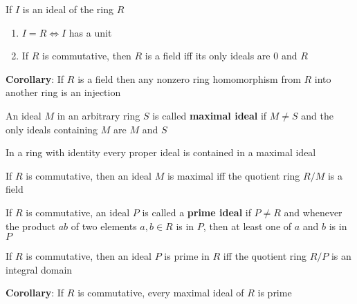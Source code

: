 \documentclass[titlepage, 12pt]{book}
\begin{document}
\begin{proposition}{}{}
    If $I$ is an ideal of the ring $R$
    \begin{enumerate}
        \item $I = R\iff I$ has a unit
        \item If $R$ is commutative, then $R$ is a field iff its only ideals are
            $0$ and $R$
    \end{enumerate}
\end{proposition}

\textbf{Corollary}: If $R$ is a field then any nonzero ring homomorphism from
$R$ into another ring is an injection

\begin{definition}{}{}
    An ideal $M$ in an arbitrary ring $S$ is called \textbf{maximal ideal} if
    $M\neq S$ and the only ideals containing $M$ are $M$ and $S$
\end{definition}

\begin{proposition}{}{}
    In a ring with identity every proper ideal is contained in a maximal ideal
\end{proposition}

\begin{proposition}{}{}
    If $R$ is commutative, then an ideal $M$ is maximal iff the quotient ring
    $R/M$ is a field
\end{proposition}

\begin{definition}{}{}
    If $R$ is commutative, an ideal $P$ is called a \textbf{prime ideal} if
    $P\neq R$ and whenever the product $ab$ of two elements $a, b\in R$ is in
    $P$, then at least one of $a$ and $b$ is in $P$
\end{definition}

\begin{proposition}{}{}
    If $R$ is commutative, then an ideal $P$ is prime in $R$ iff the quotient
    ring $R/P$ is an integral domain
\end{proposition}

\textbf{Corollary}: If $R$ is commutative, every maximal ideal of $R$ is prime
\end{document}
